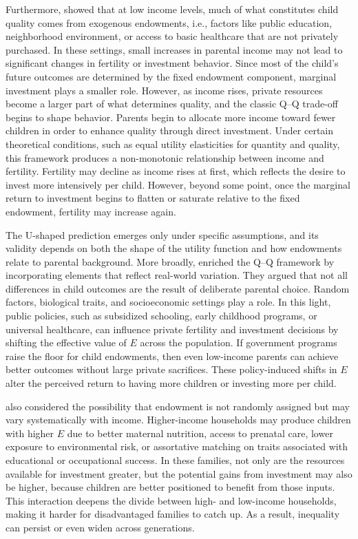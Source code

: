 \documentclass[]{AEA}
\begin{document}
Furthermore, \citet{becker1976child} showed that at low income levels,
much of what constitutes child quality comes from exogenous endowments,
i.e., factors like public education, neighborhood environment, or access
to basic healthcare that are not privately purchased. In these settings,
small increases in parental income may not lead to significant changes
in fertility or investment behavior. Since most of the child's future
outcomes are determined by the fixed endowment component, marginal
investment plays a smaller role. However, as income rises, private
resources become a larger part of what determines quality, and the
classic Q--Q trade-off begins to shape behavior. Parents begin to
allocate more income toward fewer children in order to enhance quality
through direct investment. Under certain theoretical conditions, such as
equal utility elasticities for quantity and quality, this framework
produces a non-monotonic relationship between income and fertility.
Fertility may decline as income rises at first, which reflects the
desire to invest more intensively per child. However, beyond some point,
once the marginal return to investment begins to flatten or saturate
relative to the fixed endowment, fertility may increase again.

The U-shaped prediction emerges only under specific assumptions, and its
validity depends on both the shape of the utility function and how
endowments relate to parental background. More broadly,
\citet{becker1976child} enriched the Q--Q framework by incorporating
elements that reflect real-world variation. They argued that not all
differences in child outcomes are the result of deliberate parental
choice. Random factors, biological traits, and socioeconomic settings
play a role. In this light, public policies, such as subsidized
schooling, early childhood programs, or universal healthcare, can
influence private fertility and investment decisions by shifting the
effective value of \(E\) across the population. If government programs
raise the floor for child endowments, then even low-income parents can
achieve better outcomes without large private sacrifices. These
policy-induced shifts in \(E\) alter the perceived return to having more
children or investing more per child.

\citet{becker1976child} also considered the possibility that endowment
is not randomly assigned but may vary systematically with income.
Higher-income households may produce children with higher \(E\) due to
better maternal nutrition, access to prenatal care, lower exposure to
environmental risk, or assortative matching on traits associated with
educational or occupational success. In these families, not only are the
resources available for investment greater, but the potential gains from
investment may also be higher, because children are better positioned to
benefit from those inputs. This interaction deepens the divide between
high- and low-income households, making it harder for disadvantaged
families to catch up. As a result, inequality can persist or even widen
across generations.
\end{document}
